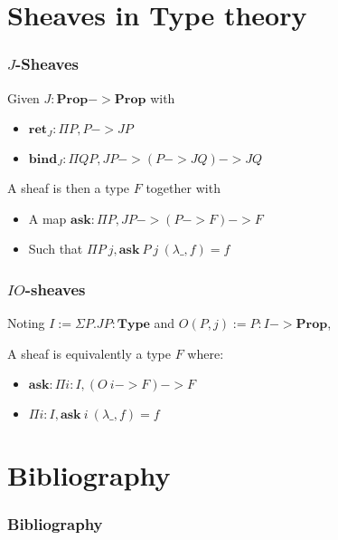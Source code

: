 \documentclass{beamer}
\newcommand{\0}{\boldsymbol{0}}
\newcommand{\1}{\boldsymbol{1}}
\begin{document}
\section{Sheaves in Type theory}

\begin{frame}
    \frametitle{$J$-Sheaves}
    Given $J : \mathbf{Prop}->\mathbf{Prop}$ with
    \begin{itemize}
        \item $\mathbf{ret}_J : \Pi P, P -> JP$
        \item $\mathbf{bind}_J : \Pi Q P, J P -> (P -> JQ)-> JQ$
    \end{itemize}
    \vspace{0.5cm}

    A sheaf is then a type $F$ together with
    \begin{itemize}
        \item A map $\mathbf{ask} : \Pi P, JP -> (P -> F) -> F$
        \item Such that $\Pi P\ j, \mathbf{ask}\ P\ j\ (\lambda \_, f) = f$
    \end{itemize}
\end{frame}
\begin{frame}
    \frametitle{$IO$-sheaves}
    Noting $I := \Sigma P. J P : \mathbf{Type}$ and $O (P,j) := P : I -> \mathbf{Prop}$,\vspace{0.5cm}

    A sheaf is equivalently a type $F$ where:
    \begin{itemize}
        \item $\mathbf{ask} : \Pi i:I, (O\ i -> F) -> F$
        \item $\Pi i:I, \mathbf{ask}\ i\ (\lambda\_, f) = f $
    \end{itemize}
\end{frame}

%
%
%
%
%

\section{Bibliography}

\begin{frame}[allowframebreaks]
    \frametitle{Bibliography}

    \printbibliography

\end{frame}
\end{document}
